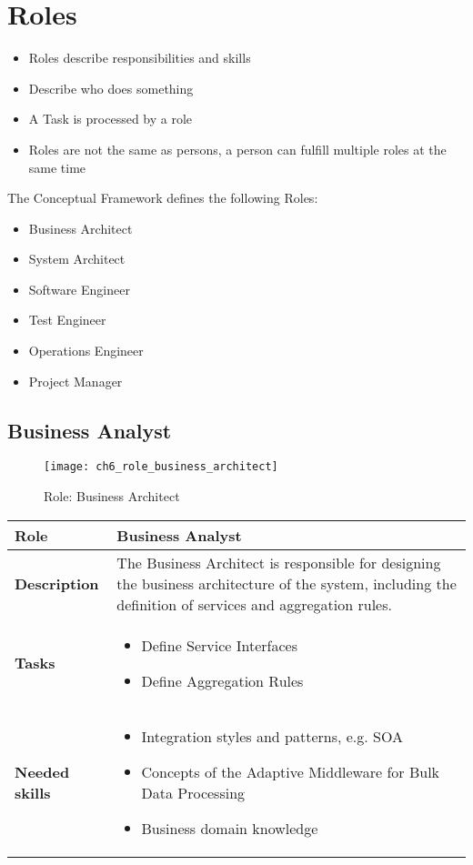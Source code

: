 \section{Roles} 

\begin{itemize}
	\item Roles describe responsibilities and skills
	\item Describe who does something
	\item A Task is processed by a role
	\item Roles are not the same as persons, a person can fulfill multiple roles at the same time
\end{itemize}

The Conceptual Framework defines the following Roles:
\begin{itemize}
	\item Business Architect
	\item System Architect 
	\item Software Engineer
	\item Test Engineer
	\item Operations Engineer
	\item Project Manager
\end{itemize}

\subsection{Business Analyst}

\begin{figure}[htpb] \centering 
	\texttt{[image: ch6\_role\_business\_architect]} 
	\caption{Role: Business Architect} 
	\label{fig:ch6_role_business_architect} 
\end{figure}

\begin{tabularx}{\textwidth}{@{} l X @{}}
	\caption{Business Architect} \label{table:ch6_Role_Business_Analysist}\\
	\toprule
	\bfseries Role & Business Analyst\\
	\midrule
	\bfseries Description & The Business Architect is responsible for designing the business architecture of the system, including the definition of services and aggregation rules.\\
	\midrule
	\bfseries Tasks & 
	\begin{itemize}
		\item Define Service Interfaces
		\item Define Aggregation Rules
	\end{itemize}
	\\
	\midrule 
	\bfseries Needed skills &
	\begin{itemize}
		\item Integration styles and patterns, e.g. \ac{SOA}
		\item Concepts of the Adaptive Middleware for Bulk Data Processing
		\item Business domain knowledge
	\end{itemize}
	\\
	\bottomrule
\end{tabularx}

